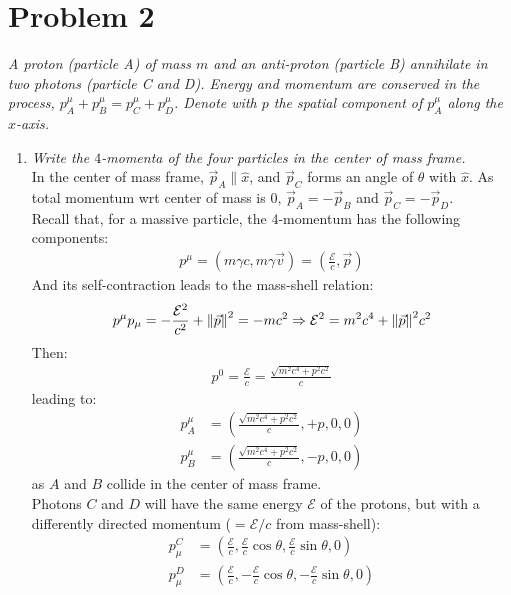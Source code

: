 \documentclass[../template.tex]{subfiles}
\begin{document}
\section{Problem 2}
\textit{A proton (particle A) of mass $m$ and an anti-proton (particle B) annihilate in two photons (particle C and D). Energy and momentum are conserved in the process, $p_A^\mu + p_B^\mu = p_C^\mu + p^\mu_D$. Denote with $p$ the spatial component of $p_A^\mu$ along the $x$-axis.}

\begin{enumerate}
    \item \textit{Write the $4$-momenta of the four particles in the center of mass frame.}\\
    In the center of mass frame, $\vec{p}_A \parallel \hat{x}$, and $\vec{p}_C$ forms an angle of $\theta$ with $\hat{x}$. As total momentum wrt center of mass is $0$, $\vec{p}_A = -\vec{p}_B$ and $\vec{p}_C = - \vec{p}_D$.\\
    Recall that, for a massive particle, the $4$-momentum has the following components:
    \begin{align*}
        p^\mu = (m \gamma c, m \gamma \vec{v}) = \left(\frac{\mathcal{E}}{c}, \vec{p}\right)
    \end{align*}           
    And its self-contraction leads to the mass-shell relation:
    \begin{align*}
        p^\mu p_\mu = -\frac{\mathcal{E}^2}{c^2} + \norm{\vec{p}}^2 = -mc^2 \Rightarrow \mathcal{E}^2 = m^2 c^4 + \norm{\vec{p}}^2 c^2 
    \end{align*}
    Then:
    \begin{align*}
        p^0 = \frac{\mathcal{E}}{c} = \frac{\sqrt{m^2 c^4 + p^2 c^2}}{c}  
    \end{align*}
    leading to:
    \begin{align*}
        p_A^\mu &= \left(\frac{\sqrt{m^2 c^4 + p^2 c^2}}{c}, +p, 0, 0 \right)\\
        p_B^\mu &= \left(\frac{\sqrt{m^2 c^4 + p^2 c^2}}{c}, -p, 0, 0 \right)
    \end{align*}
    as $A$ and $B$ collide  in the center of mass frame.\\
    Photons $C$ and $D$ will have the same energy $\mathcal{E}$ of the protons, but with a differently directed momentum ($=\mathcal{E}/c$ from mass-shell):
    \begin{align*}
        p_\mu^C &= \left(\frac{\mathcal{E}}{c}, \frac{\mathcal{E}}{c} \cos \theta, \frac{\mathcal{E}}{c} \sin \theta, 0   \right)\\
        p_\mu^D &= \left(\frac{\mathcal{E}}{c}, -\frac{\mathcal{E}}{c} \cos \theta, -\frac{\mathcal{E}}{c} \sin \theta, 0   \right)
    \end{align*}     


\end{enumerate}
\end{document}
